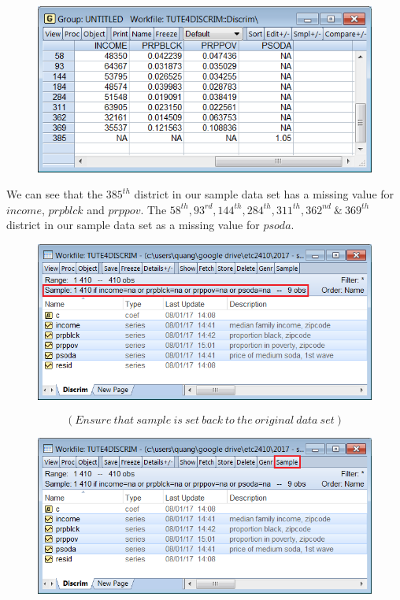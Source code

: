 \documentclass[12pt]{report}
\begin{document}
\vspace{-\baselineskip}
\begin{figure}[H]
	\centerline{\includegraphics{tute5_4}}
\end{figure}
\vspace{-\baselineskip}
\noindent We can see that the $385^{th}$ district in our sample data set has a missing value for $income$, $prpblck$ and $prppov$. The $58^{th}, 93^{rd}, 144^{th}, 284^{th}, 311^{th},  362^{nd}\ \&\ 369^{th}$ district in our sample data set as a missing value for $psoda$.
\begin{figure}[H]
	\centerline{\includegraphics{tute5_5}}
\end{figure}
\vspace{-\baselineskip}
$$(Ensure\ that\ sample\ is\ set\ back\ to\ the\ original\ data\ set) $$
\begin{figure}[H]
	\centerline{\includegraphics{tute5_6}}
\end{figure}
\end{document}
